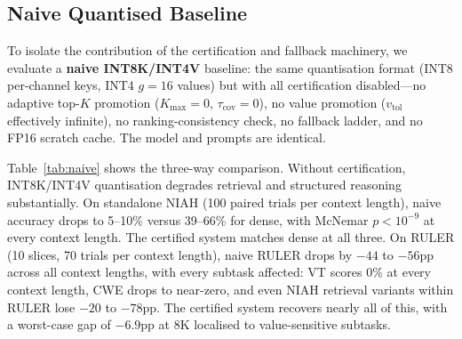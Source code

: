 \documentclass[10pt,twocolumn,a4paper]{article}
\theoremstyle{definition}
\theoremstyle{remark}
\begin{document}
\subsection{Naive Quantised Baseline}
\label{sec:naive}

To isolate the contribution of the certification and fallback machinery, we evaluate a \textbf{naive INT8K/INT4V} baseline: the same quantisation format (INT8 per-channel keys, INT4 $g{=}16$ values) but with all certification disabled---no adaptive top-$K$ promotion ($K_{\max}{=}0$, $\tau_{\mathrm{cov}}{=}0$), no value promotion ($v_{\mathrm{tol}}$ effectively infinite), no ranking-consistency check, no fallback ladder, and no FP16 scratch cache.  The model and prompts are identical.

Table~\ref{tab:naive} shows the three-way comparison.  Without certification, INT8K/INT4V quantisation degrades retrieval and structured reasoning substantially.  On standalone NIAH (100 paired trials per context length), naive accuracy drops to 5--10\% versus 39--66\% for dense, with McNemar $p < 10^{-9}$ at every context length.  The certified system matches dense at all three.  On RULER (10 slices, 70 trials per context length), naive RULER drops by $-44$ to $-56$pp across all context lengths, with every subtask affected: VT scores 0\% at every context length, CWE drops to near-zero, and even NIAH retrieval variants within RULER lose $-20$ to $-78$pp.  The certified system recovers nearly all of this, with a worst-case gap of $-6.9$pp at 8K localised to value-sensitive subtasks.
\end{document}

